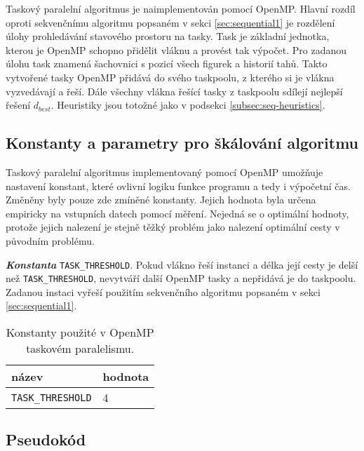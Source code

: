 \documentclass{article}
\newcommand{\const}[1]{\texttt{#1}}
\newcommand{\konstanta}[1]{\textbf{\textit{Konstanta}} \const{#1}.}
\begin{document}
    Taskový paralelní algoritmus je naimplementován pomocí OpenMP. Hlavní rozdíl oproti sekvenčnímu algoritmu
    popsaném v sekci \ref{sec:sequential1} je rozdělení úlohy prohledávání stavového prostoru na tasky. Task je
    základní jednotka, kterou je OpenMP schopno přidělit vláknu a provést tak výpočet. Pro zadanou úlohu
    task znamená šachovnici s pozicí všech figurek a historií tahů. Takto vytvořené tasky OpenMP přidává
    do svého taskpoolu, z kterého si je vlákna vyzvedávají a řeší. Dále všechny vlákna řešící tasky z
    taskpoolu sdílejí nejlepší řešení $d_{best}$. Heuristiky jsou totožné jako v podsekci \ref{subsec:seq-heuristics}.

    \subsection{Konstanty a parametry pro škálování algoritmu}
    Taskový paralelní algoritmus implementovaný pomocí OpenMP umožňuje nastavení konstant, které ovlivní
    logiku funkce programu a tedy i výpočetní čas. Změněny byly pouze zde zmíněné konstanty. Jejich hodnota
    byla určena empiricky na vstupních datech pomocí měření. Nejedná se o optimální hodnoty, protože jejich nalezení je
    stejně těžký problém jako nalezení optimální cesty v původním problému.

    \pagebreak
    \konstanta{TASK_THRESHOLD}  Pokud vlákno řeší instanci a délka její cesty je delší než \const{TASK_THRESHOLD}, nevytváří další
    OpenMP tasky a nepřidává je do taskpoolu. Zadanou instaci vyřeší použitím sekvenčního algoritmu popsaném v sekci \ref{sec:sequential1}.

    \begin{table}[hb]
        \centering
        \begin{tabular}{|l|l|}
            \hline
            název                  & hodnota \\ \hline
            \const{TASK_THRESHOLD} & 4       \\ \hline
        \end{tabular}
        \caption{Konstanty použité v OpenMP taskovém paralelismu.}
        \label{tab:data-par-constants}
    \end{table}

    \subsection{Pseudokód}
\end{document}
